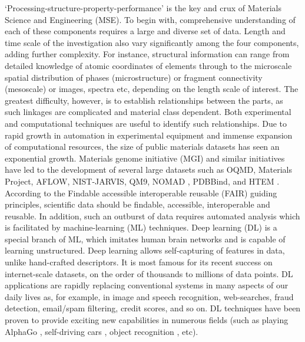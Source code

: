 \documentclass[pdflatex,sn-mathphys]{sn-jnl}%
\theoremstyle{thmstyleone}%
\theoremstyle{thmstyletwo}%
\theoremstyle{thmstylethree}%
\begin{document}
‘Processing-structure-property-performance’ is the key and crux of Materials Science and Engineering (MSE)\cite{callister2021materials}. To begin with, comprehensive understanding of each of these components requires a large and diverse set of data.  Length and time scale of the investigation also vary significantly among the four components, adding further complexity\cite{saito2013computational}. For instance, structural information can range from detailed knowledge of atomic coordinates of elements through to the microscale spatial distribution of phases (microstructure) or fragment connectivity (mesoscale) or images, spectra etc, depending on the length scale of interest. The greatest difficulty, however, is to establish relationships between the parts, as such linkages are complicated and material class dependent. Both experimental and computational techniques are useful to identify such relationships. Due to rapid growth in automation in experimental equipment and immense expansion of computational resources, the size of public materials datasets has seen an exponential growth. Materials genome initiative (MGI)\cite{de2019new} and similar initiatives have led to the development of several large datasets such as OQMD\cite{kirklin2015open}, Materials Project\cite{jain2013commentary}, AFLOW\cite{curtarolo2012aflow}, NIST-JARVIS\cite{choudhary2020joint}, QM9\cite{ramakrishnan2014quantum}, NOMAD \cite{draxl2018nomad},  PDBBind\cite{wang2005pdbbind}, and HTEM \cite{zakutayev2018open}. According to the Findable accessible interoperable reusable (FAIR)\cite{wilkinson2016fair} guiding principles, scientific data should be findable, accessible, interoperable and reusable.  In addition, such an outburst of data requires automated analysis which is facilitated by machine-learning (ML) techniques\cite{friedman2001elements,vasudevan2019materials,schmidt2019recent,butler2018machine,xu2020deep,schleder2019dft,agrawal2019deep}. 
Deep learning (DL)\cite{Goodfellow-et-al-2016} is a special branch of ML, which imitates human brain networks and is capable of learning unstructured. Deep learning allows self-capturing of features in data, unlike hand-crafted descriptors. It is most famous for its recent success on internet-scale datasets, on the order of thousands to millions of data points. DL applications are rapidly replacing conventional systems in many aspects of our daily lives as, for example, in image and speech recognition, web-searches, fraud detection, email/spam filtering, credit scores, and so on. DL techniques have been proven to provide exciting new capabilities in numerous fields (such as playing AlphaGo \cite{gibney2016google}, self-driving cars \cite{ramos2017detecting}, object recognition \cite{buduma2017fundamentals}, etc). 
\end{document}
